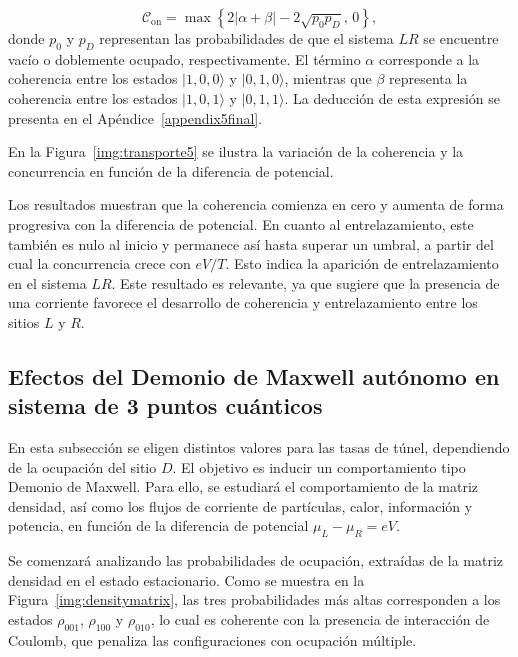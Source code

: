 \[
\mathcal{C}_{\text{on}} = \max \left\{ 2|\alpha + \beta| - 2\sqrt{p_0 p_D},\, 0 \right\},
\]
donde $p_0$ y $p_D$ representan las probabilidades de que el sistema $LR$ se encuentre vacío o doblemente ocupado, respectivamente. El término $\alpha$ corresponde a la coherencia entre los estados $|1,0,0\rangle$ y $|0,1,0\rangle$, mientras que $\beta$ representa la coherencia entre los estados $|1,0,1\rangle$ y $|0,1,1\rangle$. La deducción de esta expresión se presenta en el Apéndice~\ref{appendix5final}.  

En la Figura~\ref{img:transporte5} se ilustra la variación de la coherencia y la concurrencia en función de la diferencia de potencial.  

    
Los resultados muestran que la coherencia comienza en cero y aumenta de forma progresiva con la diferencia de potencial. En cuanto al entrelazamiento, este también es nulo al inicio y permanece así hasta superar un umbral, a partir del cual la concurrencia crece con $eV/T$. Esto indica la aparición de entrelazamiento en el sistema $LR$. Este resultado es relevante, ya que sugiere que la presencia de una corriente favorece el desarrollo de coherencia y entrelazamiento entre los sitios $L$ y $R$.  

\label{sec5:transporte}



\subsection{Efectos del Demonio de Maxwell autónomo en sistema de 3 puntos cuánticos}
En esta subsección se eligen distintos valores para las tasas de túnel, dependiendo de la ocupación del sitio $D$. El objetivo es inducir un comportamiento tipo Demonio de Maxwell. Para ello, se estudiará el comportamiento de la matriz densidad, así como los flujos de corriente de partículas, calor, información y potencia, en función de la diferencia de potencial $\mu_{L} - \mu_{R} = eV$.

Se comenzará analizando las probabilidades de ocupación, extraídas de la matriz densidad en el estado estacionario. Como se muestra en la Figura~\ref{img:densitymatrix}, las tres probabilidades más altas corresponden a los estados $\rho_{001}$, $\rho_{100}$ y $\rho_{010}$, lo cual es coherente con la presencia de interacción de Coulomb, que penaliza las configuraciones con ocupación múltiple.

